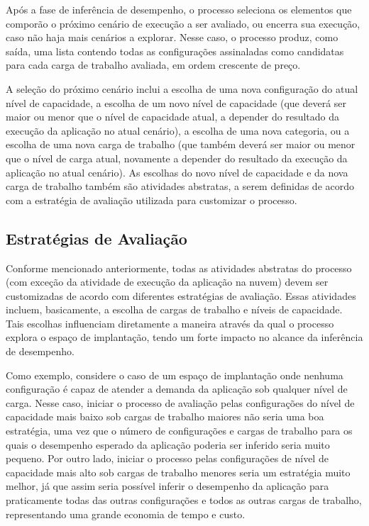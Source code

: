 \documentclass[12pt]{article}
\begin{document}
Após a fase de inferência de desempenho, o processo seleciona os elementos que comporão o próximo cenário de execução a ser avaliado, ou encerra sua execução, caso não haja mais cenários a explorar. Nesse caso, o processo produz, como saída, uma lista contendo todas as configurações assinaladas como candidatas para cada carga de trabalho avaliada, em ordem crescente de preço.

A seleção do próximo cenário inclui a escolha de uma nova configuração do atual nível de capacidade, a escolha de um novo nível de capacidade (que deverá ser maior ou menor que o nível de capacidade atual, a depender do resultado da execução da aplicação no atual cenário), a escolha de uma nova categoria, ou a escolha de uma nova carga de trabalho (que também deverá ser maior ou menor que o nível de carga atual, novamente a depender do resultado da execução da aplicação no atual cenário). As escolhas do novo nível de capacidade e da nova carga de trabalho também são atividades abstratas, a serem definidas de acordo com a estratégia de avaliação utilizada para customizar o processo. 


\subsection{Estratégias de Avaliação}\label{sec:strategies}

Conforme mencionado anteriormente, todas as atividades abstratas do processo (com exceção da atividade de execução da aplicação na nuvem) devem ser customizadas de acordo com diferentes estratégias de avaliação. Essas atividades incluem, basicamente, a escolha de cargas de trabalho e níveis de capacidade. Tais escolhas influenciam diretamente a maneira através da qual o processo explora o espaço de implantação, tendo um forte impacto no alcance da inferência de desempenho. 

Como exemplo, considere o caso de um espaço de implantação onde nenhuma configuração é capaz de atender a demanda da aplicação sob qualquer nível de carga. Nesse caso, iniciar o processo de avaliação pelas configurações do nível de capacidade mais baixo sob cargas de trabalho maiores não seria uma boa estratégia, uma vez que o número de configurações e cargas de trabalho para os quais o desempenho esperado da aplicação poderia ser inferido seria muito pequeno. Por outro lado, iniciar o processo pelas configurações de nível de capacidade mais alto sob cargas de trabalho menores seria um estratégia muito melhor, já que assim seria possível inferir o desempenho da aplicação para praticamente todas das outras configurações e todos as outras cargas de trabalho, representando uma grande economia de tempo e custo.
\end{document}
